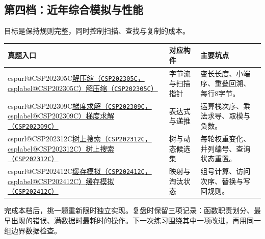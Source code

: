 \documentclass[UTF8,11pt,a4paper,fontset=none]{ctexart}
\makeatletter
\newcommand{\csp}[2]{\ifcsname cspurl@#1\endcsname\href{\csname cspurl@#1\endcsname}{#2（\texttt{#1}，\csname csplabel@#1\endcsname）}\else\href{https://oj.shumeng.tech/p/#1}{#2（\texttt{#1}）}\fi}
\makeatother
\begin{document}
\subsection{第四档：近年综合模拟与性能}
目标是保持规则完整，同时控制扫描、查找与复制的成本。
\begin{longtable}{P{5.8cm}P{3cm}P{4.9cm}}
\toprule 真题入口 & 对应构件 & 主要坑点\\\midrule\endhead
\csp{CSP202305C}{解压缩} & 字节流与扫描指针 & 变长长度、小端序、重叠回溯、每行8字节。\\
\csp{CSP202309C}{梯度求解} & 表达式与递推 & 运算栈次序、乘法求导、取模与负数。\\
\csp{CSP202312C}{树上搜索} & 树与动态候选集 & 每轮权重变化、并列编号、查询状态重置。\\
\csp{CSP202412C}{缓存模拟} & 映射与淘汰状态 & 组号计算、访问次序、替换与写回规则。\\
\bottomrule\end{longtable}
完成本档后，挑一题重新限时独立实现。复盘时保留三项记录：函数职责划分、最早出现的错误、满数据时最耗时的操作。下一次练习围绕其中一项改进，再用同一组边界数据检查。
\end{document}
